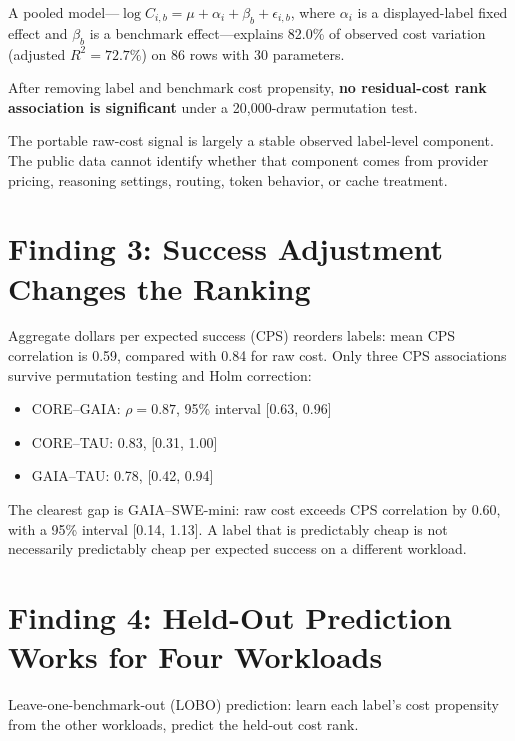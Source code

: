 \documentclass[11pt]{article}
\begin{document}
A pooled model---$\log C_{i,b} = \mu + \alpha_i + \beta_b + \epsilon_{i,b}$,
where $\alpha_i$ is a displayed-label fixed effect and $\beta_b$ is a
benchmark effect---explains 82.0\% of observed cost variation (adjusted
$R^2 = 72.7\%$) on 86 rows with 30 parameters.

After removing label and benchmark cost propensity, \textbf{no residual-cost
rank association is significant} under a 20{,}000-draw permutation test.

The portable raw-cost signal is largely a stable observed label-level
component. The public data cannot identify whether that component comes from
provider pricing, reasoning settings, routing, token behavior, or cache
treatment.

\section{Finding 3: Success Adjustment Changes the Ranking}

Aggregate dollars per expected success (CPS) reorders labels: mean CPS
correlation is 0.59, compared with 0.84 for raw cost. Only three CPS
associations survive permutation testing and Holm correction:

\begin{itemize}[nosep]
\item CORE--GAIA: $\rho = 0.87$, 95\% interval [0.63, 0.96]
\item CORE--TAU: 0.83, [0.31, 1.00]
\item GAIA--TAU: 0.78, [0.42, 0.94]
\end{itemize}

The clearest gap is GAIA--SWE-mini: raw cost exceeds CPS correlation by 0.60,
with a 95\% interval [0.14, 1.13]. A label that is predictably cheap is not
necessarily predictably cheap per expected success on a different workload.

\section{Finding 4: Held-Out Prediction Works for Four Workloads}

Leave-one-benchmark-out (LOBO) prediction: learn each label's cost propensity
from the other workloads, predict the held-out cost rank.
\end{document}
